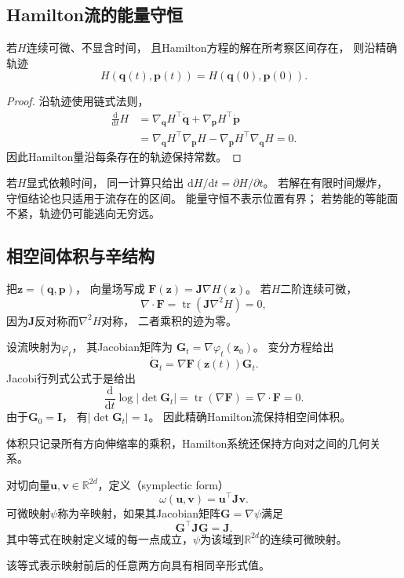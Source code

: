 \subsection{Hamilton流的能量守恒}

\begin{theorem}[Hamilton能量守恒]
	\label{thm:dynamical-hamiltonian-energy-conservation} 若$H$连续可微、不显含时间，
	且Hamilton方程的解在所考察区间存在， 则沿精确轨迹
	\[
		H(\bm{q}(t),\bm{p}(t)) = H(\bm{q}(0),\bm{p}(0)).
	\]
\end{theorem}

\begin{proof}
	沿轨迹使用链式法则，
	\[
		\begin{aligned}
			\frac{\mathrm{d}}{\mathrm{d}t}H & = \nabla_{\bm{q}}H^{\top}\dot{\bm{q}}+ \nabla_{\bm{p}}H^{\top}\dot{\bm{p}}              \\
			                                & = \nabla_{\bm{q}}H^{\top}\nabla_{\bm{p}}H - \nabla_{\bm{p}}H^{\top}\nabla_{\bm{q}}H =0.
		\end{aligned}
	\]
	因此Hamilton量沿每条存在的轨迹保持常数。
\end{proof}

若$H$显式依赖时间， 同一计算只给出
$\mathrm{d}H/\mathrm{d}t=\partial H/\partial t$。 若解在有限时间爆炸， 守恒结论也只适用于流存在的区间。
能量守恒不表示位置有界； 若势能的等能面不紧，轨迹仍可能逃向无穷远。

\subsection{相空间体积与辛结构}

把$\bm{z}=(\bm{q},\bm{p})$， 向量场写成 $\bm{F}(\bm{z})=\bm{J}\nabla H(\bm{z})$。
若$H$二阶连续可微，
\[
	\nabla\cdot\bm{F}= \operatorname{tr}(\bm{J}\nabla^{2}H)=0,
\]
因为$\bm{J}$反对称而$\nabla^{2}H$对称， 二者乘积的迹为零。

设流映射为$\varphi_{t}$， 其Jacobian矩阵为 $\bm{G}_{t}=\nabla\varphi_{t}(\bm{z}_{0})$。
变分方程给出
\[
	\dot{\bm{G}}_{t}= \nabla\bm{F}(\bm{z}(t))\bm{G}_{t}.
\]
Jacobi行列式公式于是给出
\[
	\frac{\mathrm{d}}{\mathrm{d}t}\log|\det\bm{G}_{t}| = \operatorname{tr}(\nabla\bm
	{F}) = \nabla\cdot\bm{F}=0.
\]
由于$\bm{G}_{0}=\bm{I}$， 有$|\det\bm{G}_{t}|=1$。
因此精确Hamilton流保持相空间体积。

体积只记录所有方向伸缩率的乘积，Hamilton系统还保持方向对之间的几何关系。
\begin{definition}[标准辛形式与辛映射]
\label{def:dynamical-symplectic-form-map}
对切向量$\bm{u},\bm{v}\in\mathbb{R}^{2d}$，定义（symplectic form）
\[
	\omega(\bm{u},\bm{v})=\bm{u}^{\top}\bm{J}\bm{v}.
\]
可微映射$\psi$称为辛映射，如果其Jacobian矩阵$\bm{G}=\nabla\psi$满足
\begin{equation}
	\bm{G}^{\top}\bm{J}\bm{G}=\bm{J}. \label{eq:dynamical-symplectic-map}
\end{equation}
其中等式在映射定义域的每一点成立，$\psi$为该域到$\mathbb R^{2d}$的连续可微映射。
\end{definition}
该等式表示映射前后的任意两方向具有相同辛形式值。

